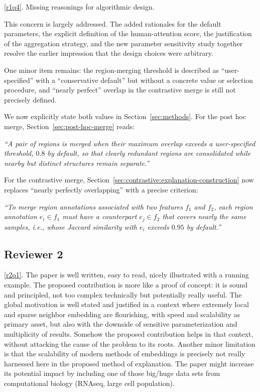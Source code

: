 \documentclass[11pt]{article}
\newcounter{rtaskno}
\newcommand{\rtask}[1]{\refstepcounter{rtaskno}\label{#1}}
\newcommand{\reviewc}[2]{\begin{leftbar}\noindent\rtask{#1}\ref{#1}. #2\end{leftbar}\vspace*{-4mm}}
\newcommand{\answer}[1]{\noindent #1\par\vspace{2mm}}
\newcommand{\copyquote}[1]{\vspace{1mm} {\itshape ``#1''}\vspace{1mm}}
\newlength{\leftbarwidth}
\newlength{\leftbarsep}
\renewenvironment{leftbar}{%
    \def\FrameCommand{{\color{black}{\vrule width \leftbarwidth\relax\hspace {\leftbarsep}}}}%
    \MakeFramed {\advance \hsize -\width \FrameRestore }%
}{\endMakeFramed}
\begin{document}
\reviewc{r1q4}{Missing reasonings for algorithmic design.

This concern is largely addressed. The added rationales for the default parameters, the explicit definition of the human-attention score, the justification of the aggregation strategy, and the new parameter sensitivity study together resolve the earlier impression that the design choices were arbitrary.

One minor item remains: the region-merging threshold is described as ``user-specified'' with a ``conservative default'' but without a concrete value or selection procedure, and ``nearly perfect'' overlap in the contrastive merge is still not precisely defined.}

\answer{%
We now explicitly state both values in Section~\ref{sec:methods}. For the post hoc merge, Section~\ref{sec:post-hoc-merge} reads:

\copyquote{A pair of regions is merged when their maximum overlap exceeds a user-specified threshold, $0.8$ by default, so that clearly redundant regions are consolidated while nearby but distinct structures remain separate.}

For the contrastive merge, Section~\ref{sec:contrastive:explanation-construction} now replaces ``nearly perfectly overlapping'' with a precise criterion:

\copyquote{To merge region annotations associated with two features $f_1$ and $f_2$, each region annotation $e_i \in f_1$ must have a counterpart $e_j \in f_2$ that covers nearly the same samples, i.e., whose Jaccard similarity with $e_i$ exceeds $0.95$ by default.}
}

\subsection*{Reviewer 2}

\reviewc{r2q1}{The paper is well written, easy to read, nicely illustrated with a running example. The proposed contribution is more like a proof of concept: it is sound and principled, not too complex technically but potentially really useful. The global motivation is well stated and justified in a context where extremely local and sparse neighbor embedding are flourishing, with speed and scalability as primary asset, but also with the downside of sensitive parameterization and multiplicity of results. Somehow the proposed contribution helps in that context, without attacking the cause of the problem to its roots. Another minor limitation is that the scalability of modern methods of embeddings is precisely not really harnessed here in the proposed method of explanation. The paper might increase its potential impact by including one of those big/huge data sets from computational biology (RNAseq, large cell population).}
\end{document}

